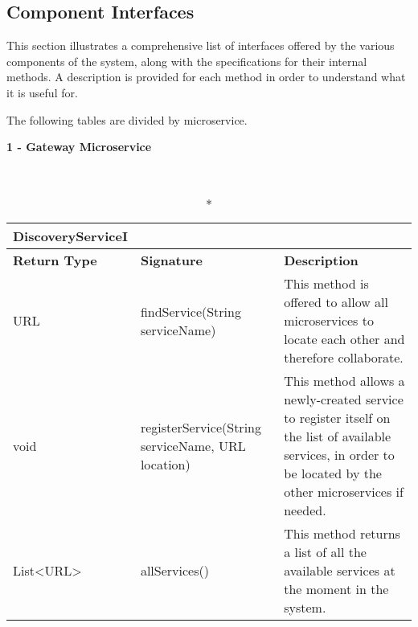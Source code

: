 \subsection{Component Interfaces}
This section illustrates a comprehensive list of interfaces offered by the various components of the \app system, along with the specifications for their internal methods. A description is provided for each method in order to understand what it is useful for.

The following tables are divided by microservice.

\renewcommand{\arraystretch}{2.3}
\setlength{\tabcolsep}{0.7cm}

\vspace{0.5cm}


\begin{large}\textbf{1 - Gateway Microservice}\end{large}\\
\begin{longtable}{|p{2.5cm} p{6.5cm} p{4.5cm}|}
\caption*{DiscoveryServiceI}\\ 

\hline
\textbf{Return Type} & \textbf{Signature} & \textbf{Description}\\
\hline \endhead

URL & findService(String serviceName) & This method is offered to allow all microservices to locate each other and therefore collaborate.\\

void & registerService(String serviceName, URL location) & This method allows a newly-created service to register itself on the list of available services, in order to be located by the other microservices if needed.\\

 List\textless URL\textgreater & allServices() & This method returns a list of all the available services at the moment in the system.\\
 \hline

\end{longtable}

